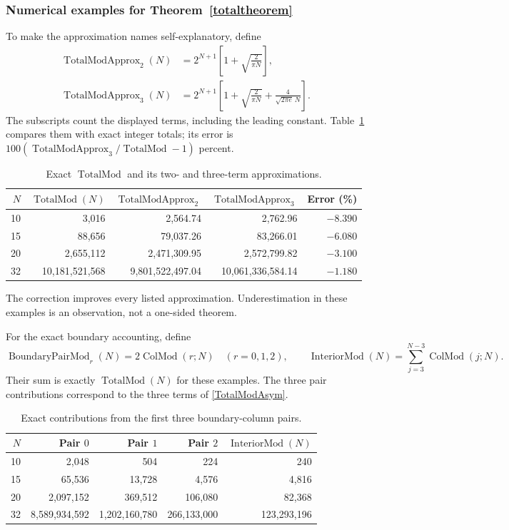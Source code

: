 \documentclass[11pt,reqno]{amsart}
\theoremstyle{remark}\newtheorem{remark}[theorem]{Remark}
\DeclareMathOperator{\ColMod}{ColMod}
\DeclareMathOperator{\TotalMod}{TotalMod}
\begin{document}
\subsubsection*{Numerical examples for Theorem~\ref{totaltheorem}}
To make the approximation names self-explanatory, define
\begin{align*}
\operatorname{TotalModApprox}_{2}(N)
&=2^{N+1}\left[1+\sqrt{\frac2{\pi N}}\right],\\
\operatorname{TotalModApprox}_{3}(N)
&=2^{N+1}\left[1+\sqrt{\frac2{\pi N}}+\frac4{\sqrt{2\pi e}\,N}\right].
\end{align*}
The subscripts count the displayed terms, including the leading constant. Table~\ref{tab:approx} compares them with exact integer totals; its error is $100(\operatorname{TotalModApprox}_3/\TotalMod-1)$ percent.
\begin{table}[htbp]
\caption{Exact $\TotalMod$ and its two- and three-term approximations.}\label{tab:approx}
\centering\scriptsize\setlength{\tabcolsep}{3pt}
\begin{tabular}{r|r|r|r|r}
$N$&$\TotalMod(N)$&$\operatorname{TotalModApprox}_2$&$\operatorname{TotalModApprox}_3$&Error (\%)\\\hline
10&3,016&2,564.74&2,762.96&$-8.390$\\
15&88,656&79,037.26&83,266.01&$-6.080$\\
20&2,655,112&2,471,309.95&2,572,799.82&$-3.100$\\
32&10,181,521,568&9,801,522,497.04&10,061,336,584.14&$-1.180$\\
\end{tabular}
\end{table}

The correction improves every listed approximation. Underestimation in these examples is an observation, not a one-sided theorem.

For the exact boundary accounting, define
\[
\operatorname{BoundaryPairMod}_r(N)=2\ColMod(r;N)\quad(r=0,1,2),
\qquad\operatorname{InteriorMod}(N)=\sum_{j=3}^{N-3}\ColMod(j;N).
\]
Their sum is exactly $\TotalMod(N)$ for these examples. The three pair contributions correspond to the three terms of \eqref{TotalModAsym}.
\begin{table}[htbp]
\caption{Exact contributions from the first three boundary-column pairs.}\label{tab:boundary}
\centering\scriptsize\setlength{\tabcolsep}{4pt}
\begin{tabular}{r|r|r|r|r}
$N$&Pair $0$&Pair $1$&Pair $2$&$\operatorname{InteriorMod}(N)$\\\hline
10&2,048&504&224&240\\
15&65,536&13,728&4,576&4,816\\
20&2,097,152&369,512&106,080&82,368\\
32&8,589,934,592&1,202,160,780&266,133,000&123,293,196\\
\end{tabular}
\end{table}
\end{document}
